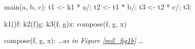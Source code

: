 \begin{minipage}{5in}%
\begin{center}%
\begin{minipage}{4in}%
\begin{AVerb}[numbers=left]
\block main(a, b, c): \label{mil_main_fig2}
  \vbinds t1 <- \app k1 * a/; \label{mil_t1_fig2}
  \vbinds t2 <- \app t1 * b/; \label{mil_t2_fig2}
  \vbinds t3 <- \app t2 * c/; \label{mil_t3_fig2}
  \return t3;

\ccblock k1()f: \mkclo[k2:f] \label{mil_k1_fig2}
\ccblock k2(f)g: \mkclo[k3:f, g] \label{mil_k2_fig2}
\ccblock k3(f, g)x: \goto compose(f, g, x) \label{mil_k3_fig2}

\block compose(f, g, x): \dots {\rm\emph{as in Figure \ref{mil_fig1b}}} \dots 
\end{AVerb}
\end{minipage}%
\end{center}%
\end{minipage}%
